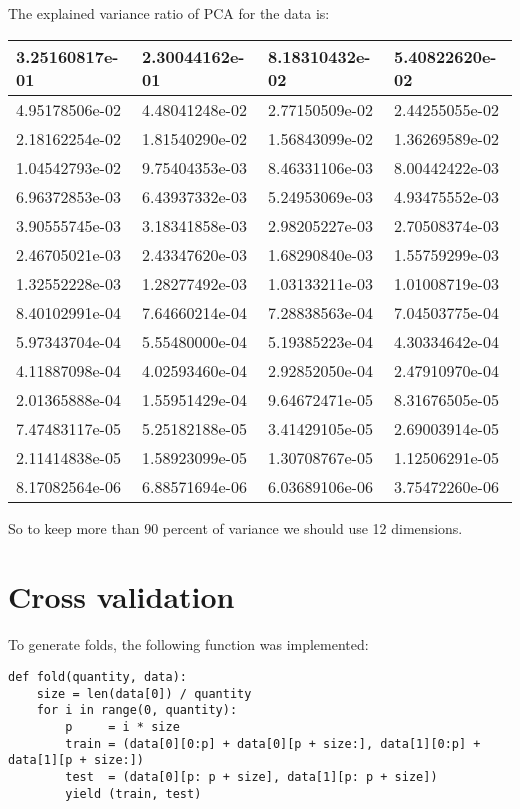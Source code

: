 \documentclass{article}
\begin{document}
The explained variance ratio of PCA for the data is:
\begin{table}[h]
    \begin{tabular}{|l|l|l|l|}
        \hline
        3.25160817e-01 & 2.30044162e-01 & 8.18310432e-02 & 5.40822620e-02  \\ \hline
        4.95178506e-02 & 4.48041248e-02 & 2.77150509e-02 & 2.44255055e-02  \\ \hline
        2.18162254e-02 & 1.81540290e-02 & 1.56843099e-02 & 1.36269589e-02  \\ \hline
        1.04542793e-02 & 9.75404353e-03 & 8.46331106e-03 & 8.00442422e-03  \\ \hline
        6.96372853e-03 & 6.43937332e-03 & 5.24953069e-03 & 4.93475552e-03  \\ \hline
        3.90555745e-03 & 3.18341858e-03 & 2.98205227e-03 & 2.70508374e-03  \\ \hline
        2.46705021e-03 & 2.43347620e-03 & 1.68290840e-03 & 1.55759299e-03  \\ \hline
        1.32552228e-03 & 1.28277492e-03 & 1.03133211e-03 & 1.01008719e-03  \\ \hline
        8.40102991e-04 & 7.64660214e-04 & 7.28838563e-04 & 7.04503775e-04  \\ \hline
        5.97343704e-04 & 5.55480000e-04 & 5.19385223e-04 & 4.30334642e-04  \\ \hline
        4.11887098e-04 & 4.02593460e-04 & 2.92852050e-04 & 2.47910970e-04  \\ \hline
        2.01365888e-04 & 1.55951429e-04 & 9.64672471e-05 & 8.31676505e-05  \\ \hline
        7.47483117e-05 & 5.25182188e-05 & 3.41429105e-05 & 2.69003914e-05  \\ \hline
        2.11414838e-05 & 1.58923099e-05 & 1.30708767e-05 & 1.12506291e-05  \\ \hline
        8.17082564e-06 & 6.88571694e-06 & 6.03689106e-06 & 3.75472260e-06  \\ \hline
    \end{tabular}
\end{table}
So to keep more than 90 percent of variance we should use 12 dimensions.

\section{Cross validation}
To generate folds, the following function was implemented:

\begin{lstlisting}
def fold(quantity, data):
    size = len(data[0]) / quantity
    for i in range(0, quantity):
        p     = i * size
        train = (data[0][0:p] + data[0][p + size:], data[1][0:p] + data[1][p + size:])
        test  = (data[0][p: p + size], data[1][p: p + size])
        yield (train, test)
\end{lstlisting}
\end{document}

